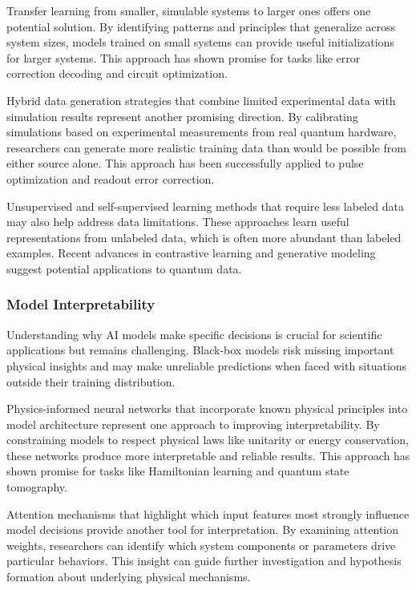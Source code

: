 Transfer learning from smaller, simulable systems to larger ones offers one potential solution. By identifying patterns and principles that generalize across system sizes, models trained on small systems can provide useful initializations for larger systems. This approach has shown promise for tasks like error correction decoding and circuit optimization.

Hybrid data generation strategies that combine limited experimental data with simulation results represent another promising direction. By calibrating simulations based on experimental measurements from real quantum hardware, researchers can generate more realistic training data than would be possible from either source alone. This approach has been successfully applied to pulse optimization and readout error correction.

Unsupervised and self-supervised learning methods that require less labeled data may also help address data limitations. These approaches learn useful representations from unlabeled data, which is often more abundant than labeled examples. Recent advances in contrastive learning and generative modeling suggest potential applications to quantum data.

\subsubsection{Model Interpretability}

Understanding why AI models make specific decisions is crucial for scientific applications but remains challenging. Black-box models risk missing important physical insights and may make unreliable predictions when faced with situations outside their training distribution.

Physics-informed neural networks that incorporate known physical principles into model architecture represent one approach to improving interpretability. By constraining models to respect physical laws like unitarity or energy conservation, these networks produce more interpretable and reliable results. This approach has shown promise for tasks like Hamiltonian learning and quantum state tomography.

Attention mechanisms that highlight which input features most strongly influence model decisions provide another tool for interpretation. By examining attention weights, researchers can identify which system components or parameters drive particular behaviors. This insight can guide further investigation and hypothesis formation about underlying physical mechanisms.

